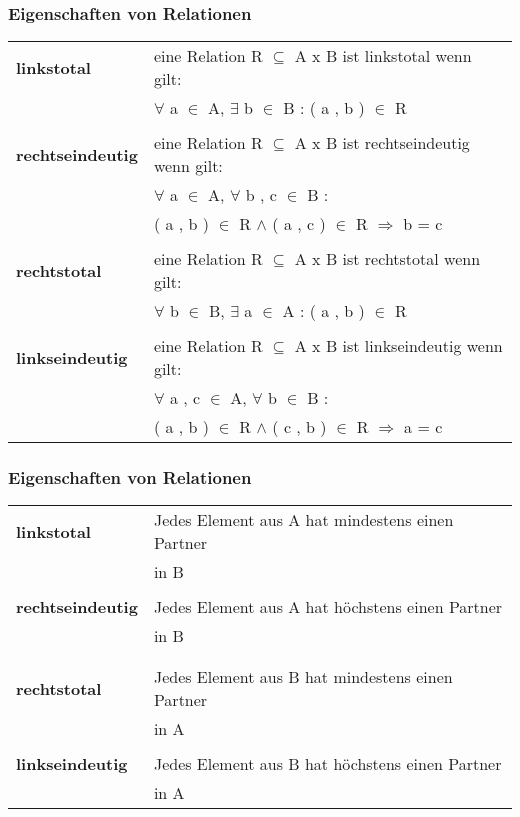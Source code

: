 \documentclass{beamer}
\begin{document}
\begin{frame}
	\frametitle {Eigenschaften von Relationen}
	\begin{tabular} {l l}
		\textbf {linkstotal} & eine Relation R $ \subseteq $ A x B ist linkstotal 	wenn gilt: \\
& $ \forall $ a $ \in $ A, $ \exists $ b $ \in $ B : ( a , b ) $ \in $ R \\
\\
		\textbf {rechtseindeutig} &eine Relation R $ \subseteq $ A x B ist rechtseindeutig wenn gilt: \\
& $ \forall $ a $ \in $ A, $ \forall $ b , c $ \in $ B : \\
& ( a , b ) $ \in $ R $ \land $ ( a , c ) $ \in $ R $\Rightarrow$ b = c \\
\\
		\textbf {rechtstotal } & eine Relation R $ \subseteq $ A x B ist rechtstotal wenn gilt: \\
& $ \forall $ b $ \in $ B, $ \exists $ a $ \in $ A : ( a , b ) $ \in $ R \\
\\
		\textbf {linkseindeutig} &eine Relation R $ \subseteq $ A x B ist linkseindeutig wenn gilt: \\
& $ \forall $ a , c $ \in $ A, $ \forall $ b $ \in $ B : \\
& ( a , b ) $ \in $ R $ \land $ ( c , b ) $ \in $ R $\Rightarrow$ a = c \\
	\end{tabular}
\end{frame}
		
\begin{frame}
	\frametitle {Eigenschaften von Relationen}
	\begin{tabular} {l l}
		\textbf {linkstotal} & Jedes Element aus A hat mindestens einen Partner\\ &in B \\
\\
		\textbf {rechtseindeutig} & Jedes Element aus A hat höchstens einen Partner\\ & in B \\ \\
\\
		\textbf {rechtstotal } & Jedes Element aus B hat mindestens einen Partner\\ & in A
\\
\\
		\textbf {linkseindeutig} & Jedes Element aus B hat höchstens einen Partner\\& in A
\\
	\end{tabular}
\end{frame}	
\end{document}
